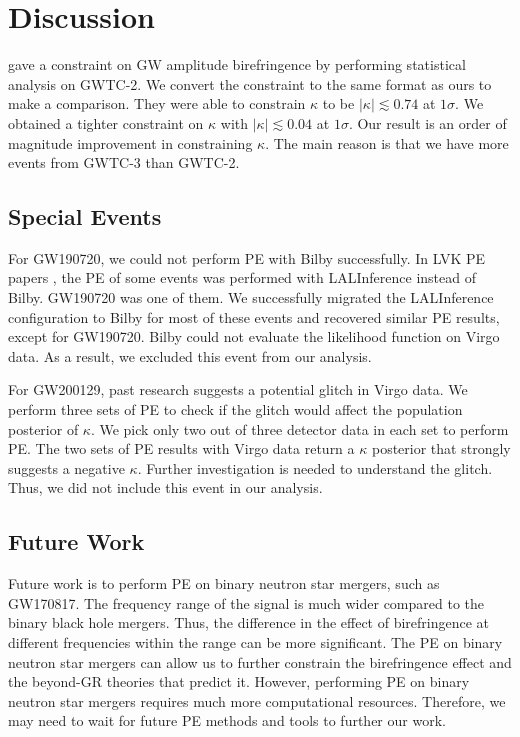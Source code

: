 \documentclass[aps,prd,twocolumn,superscriptaddress,preprintnumbers,floatfix,nofootinbib]{revtex4-2}
\begin{document}
\section{Discussion}
\label{sec:Discussion}

\citet{Okounkova_2022} gave a constraint on GW amplitude birefringence by performing statistical analysis on GWTC-2.
We convert the constraint to the same format as ours to make a comparison.
They were able to constrain $\kappa$ to be $|\kappa| \lesssim 0.74$ at $1 \sigma$.
We obtained a tighter constraint on $\kappa$ with $|\kappa| \lesssim 0.04$ at $1 \sigma$.
Our result is an order of magnitude improvement in constraining $\kappa$.
The main reason is that we have more events from GWTC-3 than GWTC-2.

\subsection{Special Events}

For GW190720, we could not perform PE with Bilby successfully.
In LVK PE papers \citep{GWTC-2.1, GWTC-3}, the PE of some events was performed with LALInference \citep{lalsuite} instead of Bilby.
GW190720 was one of them.
We successfully migrated the LALInference configuration to Bilby for most of these events and recovered similar PE results, except for GW190720.
Bilby could not evaluate the likelihood function on Virgo data.
As a result, we excluded this event from our analysis.

For GW200129, past research suggests a potential glitch in Virgo data. \citep{GW200129_glitch}
We perform three sets of PE to check if the glitch would affect the population posterior of $\kappa$.
We pick only two out of three detector data in each set to perform PE.
The two sets of PE results with Virgo data return a $\kappa$ posterior that strongly suggests a negative $\kappa$.
Further investigation is needed to understand the glitch.
Thus, we did not include this event in our analysis.

\subsection{Future Work}
Future work is to perform PE on binary neutron star mergers, such as GW170817.
The frequency range of the signal is much wider compared to the binary black hole mergers.
Thus, the difference in the effect of birefringence at different frequencies within the range can be more significant.
The PE on binary neutron star mergers can allow us to further constrain the birefringence effect and the beyond-GR theories that predict it.
However, performing PE on binary neutron star mergers requires much more computational resources.
Therefore, we may need to wait for future PE methods and tools to further our work.
\end{document}
